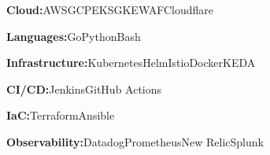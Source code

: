 
\begin{cvlist}
  {
    \begin{cvitems}
    \item {\textbf{Cloud:}{\enskip}AWS{\enskip\cdotp\enskip}GCP{\enskip\cdotp\enskip}EKS{\enskip\cdotp\enskip}GKE{\enskip\cdotp\enskip}WAF{\enskip\cdotp\enskip}Cloudflare}
      \item {\textbf{Languages:}{\enskip}Go{\enskip\cdotp\enskip}Python{\enskip\cdotp\enskip}Bash}
      \item {\textbf{Infrastructure:}{\enskip}Kubernetes{\enskip\cdotp\enskip}Helm{\enskip\cdotp\enskip}Istio{\enskip\cdotp\enskip}Docker{\enskip\cdotp\enskip}KEDA}
      \item {\textbf{CI/CD:}{\enskip}Jenkins{\enskip\cdotp\enskip}GitHub Actions}
      \item {\textbf{IaC:}{\enskip}Terraform{\enskip\cdotp\enskip}Ansible}
      \item {\textbf{Observability:}{\enskip}Datadog{\enskip\cdotp\enskip}Prometheus{\enskip\cdotp\enskip}New Relic{\enskip\cdotp\enskip}Splunk}
    \end{cvitems}
  }
\end{cvlist}


